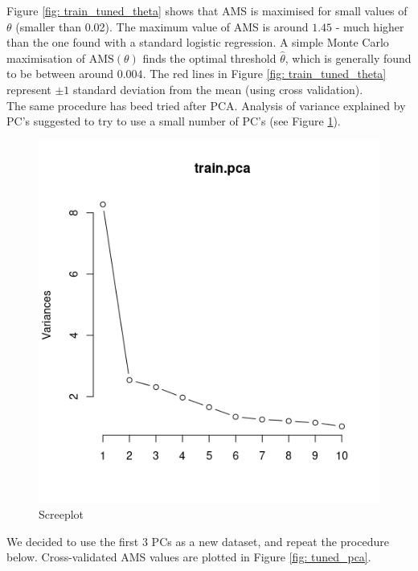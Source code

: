 \documentclass[]{article}
\begin{document}
Figure \ref{fig: train_tuned_theta} shows that AMS is maximised for small values of $\theta$ (smaller than 0.02). The maximum value of AMS is around $1.45$ - much higher than the one found with a standard logistic regression. A simple Monte Carlo maximisation of $\text{AMS}(\theta)$ finds the optimal threshold $\hat{\theta}$, which is generally found to be between around $0.004$. The red lines in Figure \ref{fig: train_tuned_theta} represent $\pm1$ standard deviation from the mean (using cross validation). \\

The same procedure has beed tried after PCA. Analysis of variance explained by PC's suggested to try to use a small number of PC's (see Figure \ref{fig: screeplot}).
\begin{figure}[H]
\centering
\includegraphics[scale=0.7]{../Pictures/trainpcascreeplot.png} 
\caption{Screeplot}
\label{fig: screeplot}
\end{figure}

We decided to use the first $3$ PCs as a new dataset, and repeat the procedure below. Cross-validated AMS values are plotted in Figure \ref{fig: tuned_pca}.
\end{document}
